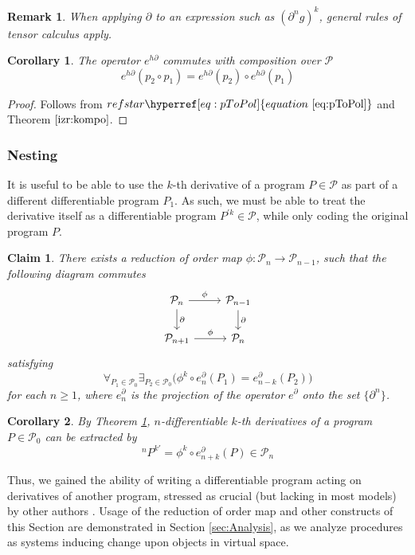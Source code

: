 \documentclass{article}
\makeatletter
\newcommand{\dP}{\mathcal{P}}
\newcommand{\D}{\partial}
\newtheorem{trditev}{Claim}[section]
\newtheorem{opomba}{Remark}[section]
\newtheorem{corollary}{Corollary}[section]
\let\originaleqref\eqref %
\renewcommand{\eqref}[1]{%
  \begingroup%
  \let\ref\@refstar%
  \hyperref[#1]{%
    equation%
    ~\originaleqref{#1}%
  }%
  \endgroup
}
\makeatother
\begin{document}
 \begin{opomba}
 When applying $\D$ to an expression such as $(\D^n g)^k$, general rules of tensor calculus apply. 
 \end{opomba}
 
   \begin{corollary}\label{izr:komp_homo}
   The operator $e^{h\D}$ commutes with composition over $\dP$
   \begin{equation}
   e^{h\D}(p_2\circ p_1)=e^{h\D}(p_2)\circ e^{h\D}(p_1)
   \end{equation}
   \end{corollary}
   
   \begin{proof}
   Follows from $\eqref{eq:pToPol}$ and Theorem $\ref{izr:kompo}$.
   \end{proof}
 
 \subsubsection{Nesting}
 
 It is useful to be able to use the $k$-th derivative of a program $P\in\dP$ as part of a different differentiable program $P_1$. As such, we must be able to treat the derivative itself as a differentiable program $P^{\prime k}\in\dP$, while only coding the original program $P$. 
\begin{trditev}\label{izr:reductionMap}
There exists a reduction of order map $\phi:\dP_n\to \dP_{n-1}$, such that the
following  diagram commutes
\begin{equation}\label{eq:reductionMap}
\begin{tikzcd}
  \dP_n \arrow{r}{\phi} \arrow{d}{\D} & 
  \dP_{n-1} \arrow{d}{\D}\\
  \dP_{n+1} 
  \arrow{r}{\phi}& \dP_{n}
\end{tikzcd}
\end{equation}
satisfying
\begin{equation}
\forall_{P_1\in\dP_0}\exists_{P_2\in\dP_0}\Big(\phi^k\circ e^\D_n(P_1)=e^\D_{n-k}(P_2)\Big)
\end{equation}
for each $n\ge 1$, where $e^\D_n$ is the projection of the operator $e^\D$ onto the set $\{\D^n\}$.
\end{trditev}  
\begin{corollary}
By Theorem \ref{izr:reductionMap}, $n$-differentiable $k$-th derivatives of a program $P\in\dP_0$ can be extracted by
\begin{equation}
^{n}P^{k\prime}=\phi^k\circ e^\D_{n+k}(P)\in\dP_n
\end{equation}
\end{corollary}    
 Thus, we gained the ability of writing a differentiable program acting on derivatives of another program, stressed as crucial (but lacking in most models) by other authors \cite{AD1}. Usage of the reduction of order map and other constructs of this Section are demonstrated in Section \ref{sec:Analysis}, as we analyze procedures as systems inducing change upon objects in virtual space.
 
\end{document}
